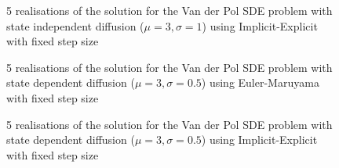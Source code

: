 \begin{figure}[H]
    \centering
    \caption{5 realisations of the solution for the Van der Pol SDE problem with state independent diffusion ($\mathit{\mu = 3, \sigma=1}$) using Implicit-Explicit with fixed step size}
    \label{4_5_ImplicitExplicit_Independent}
\end{figure}

\begin{figure}[H]
    \centering
    \caption{5 realisations of the solution for the Van der Pol SDE problem with state dependent diffusion ($\mathit{\mu = 3, \sigma=0.5}$) using Euler-Maruyama with fixed step size}
    \label{4_5_EulerMaruyama_dependent}
\end{figure}

\begin{figure}[H]
    \centering
    \caption{5 realisations of the solution for the Van der Pol SDE problem with state dependent diffusion ($\mathit{\mu = 3, \sigma=0.5}$) using Implicit-Explicit with fixed step size}
    \label{4_5_ImplicitExplicit_dependent}
\end{figure}

